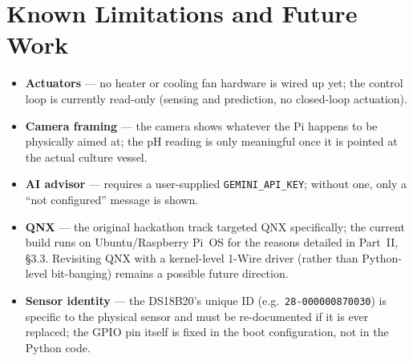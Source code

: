 \documentclass[11pt]{article}
\begin{document}
\section{Known Limitations and Future Work}

\begin{itemize}
    \item \textbf{Actuators} --- no heater or cooling fan hardware is wired up yet; the control loop is currently read-only (sensing and prediction, no closed-loop actuation).
    \item \textbf{Camera framing} --- the camera shows whatever the Pi happens to be physically aimed at; the pH reading is only meaningful once it is pointed at the actual culture vessel.
    \item \textbf{AI advisor} --- requires a user-supplied \texttt{GEMINI\_API\_KEY}; without one, only a ``not configured'' message is shown.
    \item \textbf{QNX} --- the original hackathon track targeted QNX specifically; the current build runs on Ubuntu/Raspberry Pi~OS for the reasons detailed in Part~II, \S3.3. Revisiting QNX with a kernel-level 1-Wire driver (rather than Python-level bit-banging) remains a possible future direction.
    \item \textbf{Sensor identity} --- the DS18B20's unique ID (e.g.\ \texttt{28-000000870030}) is specific to the physical sensor and must be re-documented if it is ever replaced; the GPIO pin itself is fixed in the boot configuration, not in the Python code.
\end{itemize}
\end{document}
